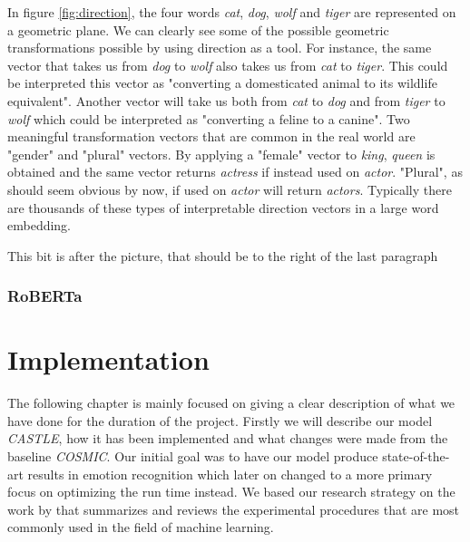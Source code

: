 \documentclass[nofilelist]{cslthse-msc}
\begin{document}
In figure \ref{fig:direction}, the four words \textit{cat}, \textit{dog}, \textit{wolf} and \textit{tiger} are represented on a geometric plane. We can clearly see some of the possible geometric transformations possible by using direction as a tool. For instance, the same vector that takes us from \textit{dog} to \textit{wolf} also takes us from \textit{cat} to \textit{tiger}. This could be interpreted this vector as "converting a domesticated animal to its wildlife equivalent". Another vector will take us both from \textit{cat} to \textit{dog} and from \textit{tiger} to \textit{wolf} which could be interpreted as "converting a feline to a canine". Two meaningful transformation vectors that are common in the real world are "gender" and "plural" vectors. By applying a "female" vector to \textit{king}, \textit{queen} is obtained and the same vector returns \textit{actress} if instead used on \textit{actor}. "Plural", as should seem obvious by now, if used on \textit{actor} will return \textit{actors}. Typically there are thousands of these types of interpretable direction vectors in a large word embedding.


This bit is after the picture, that should be to the right of the last paragraph

\subsection{RoBERTa}













\chapter{Implementation}
The following chapter is mainly focused on giving a clear description of what we have done for the duration of the project. Firstly we will describe our model \textit{CASTLE}, how it has been implemented and what changes were made from the baseline \textit{COSMIC}. Our initial goal was to have our model produce state-of-the-art results in emotion recognition which later on changed to a more primary focus on optimizing the run time instead. 
We based our research strategy on the work by \citet{bouthillier:hal-02447823} that summarizes and reviews the experimental procedures that are most commonly used in the field of machine learning.
\end{document}
